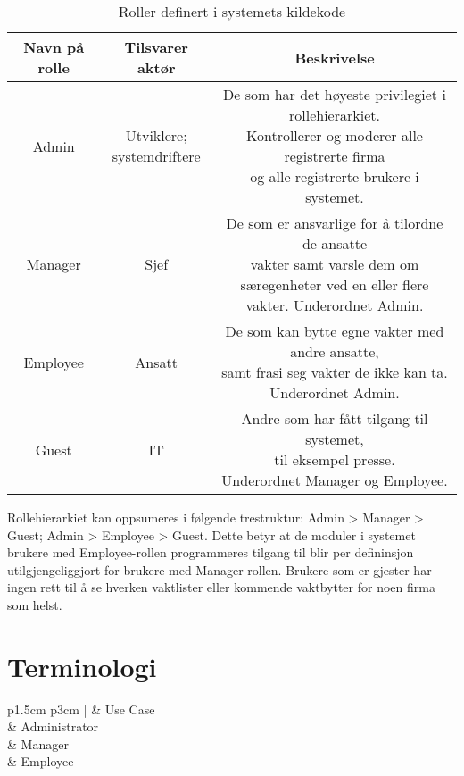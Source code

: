 \begin{table}[h!]
\begin{center}
 \begin{tabular}{||c c c||}
 \hline
 Navn på rolle & Tilsvarer aktør & Beskrivelse \\ [0.5ex]
 \hline\hline
 Admin & \shortstack{Utviklere;\\systemdriftere} & \shortstack{De som har det høyeste privilegiet i rollehierarkiet.\\Kontrollerer og moderer alle registrerte firma\\og alle registrerte brukere i systemet.}  \\
 \hline
 Manager &Sjef& \shortstack{De som er ansvarlige for å tilordne de ansatte\\vakter samt varsle dem om\\særegenheter ved en eller flere vakter. Underordnet Admin.} \\
 \hline
 Employee &Ansatt& \shortstack{De som kan bytte egne vakter med andre ansatte,\\samt frasi seg vakter de ikke kan ta.\\Underordnet Admin.} \\
 \hline
 Guest &IT& \shortstack{Andre som har fått tilgang til systemet,\\til eksempel presse.\\Underordnet Manager og Employee.} \\
 \hline
 \end{tabular}
\caption{Roller definert i systemets kildekode}
\label{table:1}
\end{center}
\end{table}

Rollehierarkiet kan oppsumeres i følgende trestruktur: Admin > Manager > Guest; Admin > Employee > Guest. Dette betyr at de moduler i systemet brukere med Employee-rollen programmeres tilgang til blir per defininsjon utilgjengeliggjort for brukere med Manager-rollen. Brukere som er gjester har ingen rett til å se hverken vaktlister eller kommende vaktbytter for noen firma som helst.
\newpage
\section{Terminologi}
\begin{tabular}{p{1.5cm} p{3cm} | }
	\hline
	 & Use Case\\
	 & Administrator\\
	 & Manager\\
	 & Employee\\
	\hline
\end{tabular}
\\[1cm]
